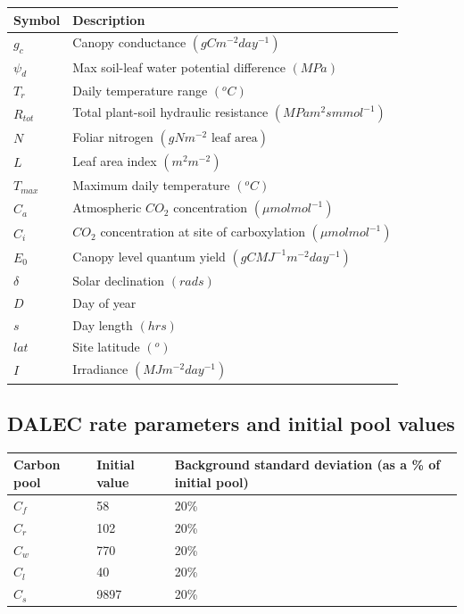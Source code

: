 \documentclass[11pt]{article}
\begin{document}
\begin{center}
\begin{tabular}{| l | l |}
\hline
Symbol & Description \\ \hline
$g_c$ & Canopy conductance $(gCm^{-2}day^{-1})$ \\ \hline
$\psi_d$ & Max soil-leaf water potential difference $(MPa)$ \\ \hline
$T_r$ & Daily temperature range $( ^{o}C)$ \\ \hline
$R_{tot}$ & Total plant-soil hydraulic resistance $(MPa m^2s mmol^{-1})$ \\ \hline
$N$ & Foliar nitrogen $(gNm^{-2} \text{ leaf area})$  \\ \hline
$L$ & Leaf area index $(m^2 m^{-2})$ \\ \hline
$T_{max}$ & Maximum daily temperature $( ^{o}C)$  \\ \hline
$C_a$ & Atmospheric $CO_2$ concentration $(\mu mol mol^{-1})$ \\ \hline
$C_i$ & $CO_2$ concentration at site of carboxylation $(\mu mol mol^{-1})$ \\ \hline
$E_0$ & Canopy level quantum yield $(gCMJ^{-1}m^{-2}day^{-1})$ \\ \hline
$\delta$ & Solar declination $(rads)$ \\ \hline
$D$ & Day of year \\ \hline
$s$ & Day length $(hrs)$ \\  \hline  
$lat$ & Site latitude $( ^{o})$ \\ \hline
$I$ & Irradiance $(MJm^{-2}day^{-1})$ \\ 
\hline
\end{tabular}    
\end{center}

\subsection*{DALEC rate parameters and initial pool values}

\begin{center}
\begin{tabular}{| l | l | l |}
\hline
Carbon pool & Initial value & Background standard deviation (as a \% of initial pool) \\ \hline
$C_f$ & 58 & 20\% \\ \hline
$C_r$ & 102 & 20\% \\ \hline
$C_w$ & 770 & 20\% \\ \hline
$C_l$ & 40 & 20\% \\ \hline
$C_s$ & 9897 & 20\% \\ 
\hline
\end{tabular}    
\end{center}
\end{document}
